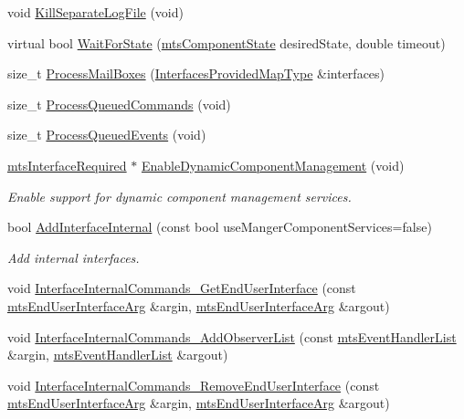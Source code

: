 \begin{DoxyCompactItemize}
void \hyperlink{classmts_component_a88650abb8ed5890c29dc43668f1bccf4}{Kill\-Separate\-Log\-File} (void)
\item 
virtual bool \hyperlink{classmts_component_a936b8338f2c699abbf40faeaed3dff6e}{Wait\-For\-State} (\hyperlink{classmts_component_state}{mts\-Component\-State} desired\-State, double timeout)
\item 
size\-\_\-t \hyperlink{classmts_component_a1012e9c56f4ad1e3e4ff50cf91597f63}{Process\-Mail\-Boxes} (\hyperlink{classmts_component_a1d4117bf122737abe5f943a7ce057ff6}{Interfaces\-Provided\-Map\-Type} \&interfaces)
\item 
size\-\_\-t \hyperlink{classmts_component_a63f22cf3b9b991e8d4762ea563396174}{Process\-Queued\-Commands} (void)
\item 
size\-\_\-t \hyperlink{classmts_component_a9d424fa33b3234ff3d2672b62e9f1675}{Process\-Queued\-Events} (void)
\item 
\hyperlink{classmts_interface_required}{mts\-Interface\-Required} $\ast$ \hyperlink{classmts_component_aa63a28894e3fd44a231924a24d40428a}{Enable\-Dynamic\-Component\-Management} (void)
\begin{DoxyCompactList}\small\item\em Enable support for dynamic component management services. \end{DoxyCompactList}\item 
bool \hyperlink{classmts_component_af24429ddbfe7177fcfaf35482254f917}{Add\-Interface\-Internal} (const bool use\-Manger\-Component\-Services=false)
\begin{DoxyCompactList}\small\item\em Add internal interfaces. \end{DoxyCompactList}\item 
void \hyperlink{classmts_component_a4b1bf49f0edcbbe123e40399f971e494}{Interface\-Internal\-Commands\-\_\-\-Get\-End\-User\-Interface} (const \hyperlink{classmts_end_user_interface_arg}{mts\-End\-User\-Interface\-Arg} \&argin, \hyperlink{classmts_end_user_interface_arg}{mts\-End\-User\-Interface\-Arg} \&argout)
\item 
void \hyperlink{classmts_component_ad9814156d7cd119f30b49671e38bbaf3}{Interface\-Internal\-Commands\-\_\-\-Add\-Observer\-List} (const \hyperlink{classmts_event_handler_list}{mts\-Event\-Handler\-List} \&argin, \hyperlink{classmts_event_handler_list}{mts\-Event\-Handler\-List} \&argout)
\item 
void \hyperlink{classmts_component_ab9c1d9ee9ee050e75b11b839f8516e1c}{Interface\-Internal\-Commands\-\_\-\-Remove\-End\-User\-Interface} (const \hyperlink{classmts_end_user_interface_arg}{mts\-End\-User\-Interface\-Arg} \&argin, \hyperlink{classmts_end_user_interface_arg}{mts\-End\-User\-Interface\-Arg} \&argout)

\end{DoxyCompactItemize}
